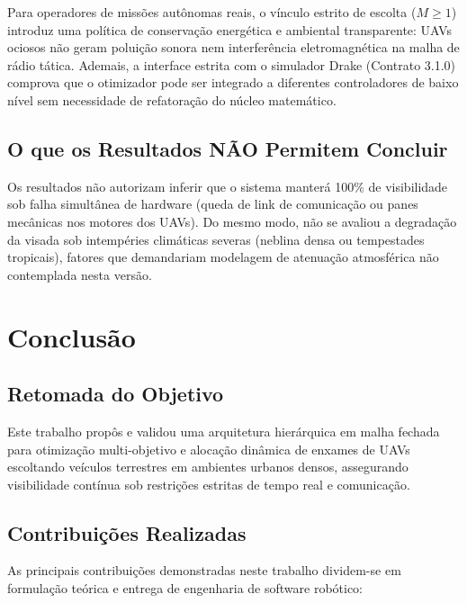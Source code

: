 \documentclass[
  brazilian,
  a4paper]{article}
\begin{document}
Para operadores de missões autônomas reais, o vínculo estrito de escolta
(\(M \ge 1\)) introduz uma política de conservação energética e
ambiental transparente: UAVs ociosos não geram poluição sonora nem
interferência eletromagnética na malha de rádio tática. Ademais, a
interface estrita com o simulador Drake (Contrato 3.1.0) comprova que o
otimizador pode ser integrado a diferentes controladores de baixo nível
sem necessidade de refatoração do núcleo matemático.

\subsection{O que os Resultados NÃO Permitem
Concluir}\label{o-que-os-resultados-nuxe3o-permitem-concluir}

Os resultados não autorizam inferir que o sistema manterá 100\% de
visibilidade sob falha simultânea de hardware (queda de link de
comunicação ou panes mecânicas nos motores dos UAVs). Do mesmo modo, não
se avaliou a degradação da visada sob intempéries climáticas severas
(neblina densa ou tempestades tropicais), fatores que demandariam
modelagem de atenuação atmosférica não contemplada nesta versão.

\section{Conclusão}\label{conclusuxe3o}

\subsection{Retomada do Objetivo}\label{retomada-do-objetivo}

Este trabalho propôs e validou uma arquitetura hierárquica em malha
fechada para otimização multi-objetivo e alocação dinâmica de enxames de
UAVs escoltando veículos terrestres em ambientes urbanos densos,
assegurando visibilidade contínua sob restrições estritas de tempo real
e comunicação.

\subsection{Contribuições
Realizadas}\label{contribuiuxe7uxf5es-realizadas}

As principais contribuições demonstradas neste trabalho dividem-se em
formulação teórica e entrega de engenharia de software robótico:
\end{document}
